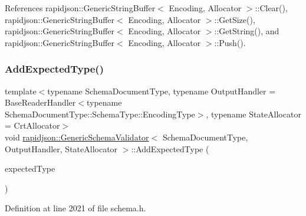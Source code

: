 \begin{DoxyCode}{0}
\end{DoxyCode}


References rapidjson\+::\+Generic\+String\+Buffer$<$ Encoding, Allocator $>$\+::\+Clear(), rapidjson\+::\+Generic\+String\+Buffer$<$ Encoding, Allocator $>$\+::\+Get\+Size(), rapidjson\+::\+Generic\+String\+Buffer$<$ Encoding, Allocator $>$\+::\+Get\+String(), and rapidjson\+::\+Generic\+String\+Buffer$<$ Encoding, Allocator $>$\+::\+Push().

\mbox{\label{classrapidjson_1_1_generic_schema_validator_aeedf35fabd022f1d1587fed1dd21e437}} 
\subsubsection{\texorpdfstring{AddExpectedType()}{AddExpectedType()}}
{\footnotesize\ttfamily template$<$typename Schema\+Document\+Type, typename Output\+Handler = Base\+Reader\+Handler$<$typename Schema\+Document\+Type\+::\+Schema\+Type\+::\+Encoding\+Type$>$, typename State\+Allocator = Crt\+Allocator$>$ \\
void \mbox{\hyperlink{classrapidjson_1_1_generic_schema_validator}{rapidjson\+::\+Generic\+Schema\+Validator}}$<$ Schema\+Document\+Type, Output\+Handler, State\+Allocator $>$\+::Add\+Expected\+Type (\begin{DoxyParamCaption}\item[{const typename Schema\+Type\+::\+Value\+Type \&}]{expected\+Type }\end{DoxyParamCaption})}



Definition at line 2021 of file schema.\+h.


